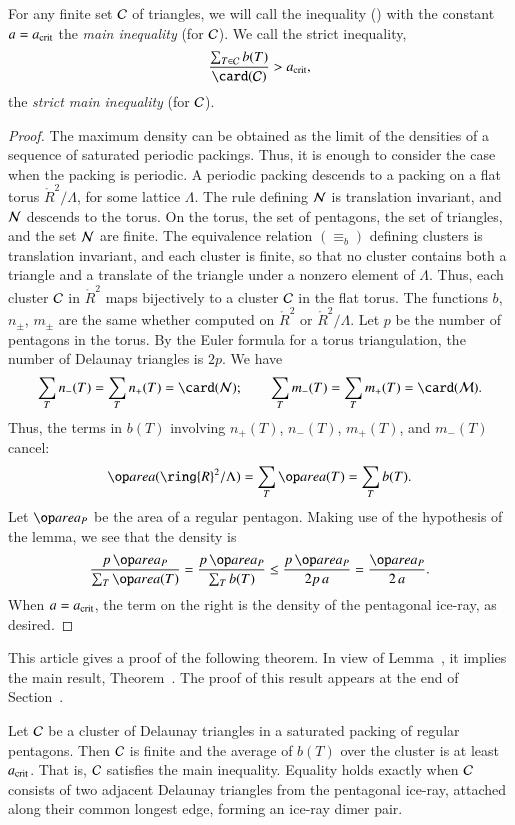 For any finite set $\mathcal C$ of triangles, we will call the inequality
() with the constant $a=a_\text{crit}$ the {\it main inequality}
(for $\mathcal C$).  We call the strict inequality,
\begin{equation}\libel{eqn:strict-main}
\frac{\sum_{T\in \C} b(T)}{\card(\C)} > \acrit,
\end{equation}
the {\it strict main inequality} (for $\mathcal C$).


\begin{proof} The maximum density can be obtained as the limit of the
  densities of a sequence of saturated periodic packings.  Thus, it is
  enough to consider the case when the packing is periodic.  A
  periodic packing descends to a packing on a flat torus
  $\ring{R}^2/\Lambda$, for some lattice $\Lambda$.  The rule defining
  $\mathcal N$ is translation invariant, and $\mathcal N$ descends to the torus.  On
  the torus, the set of pentagons, the set of triangles, and the set
  $\mathcal N$ are finite.  The equivalence relation $(\equiv_b)$ defining
  clusters is translation invariant, and each cluster is finite, so
  that no cluster contains both a triangle and a translate of the
  triangle under a nonzero element of $\Lambda$.  Thus, each cluster
  $\mathcal C$ in $\ring{R}^2$ maps bijectively to a cluster $\mathcal C$ in the flat
  torus.  The functions $b$, $n_\pm$, $m_\pm$ are the same whether
  computed on $\ring{R}^2$ or $\ring{R}^2/\Lambda$.  Let $p$ be the
  number of pentagons in the torus.  By the Euler formula for a torus
  triangulation, the number of Delaunay triangles is $2p$.  We have
\[
\sum_{T} n_-(T) =  \sum_{T} n_+(T) = \card(\N);\qquad
\sum_{T} m_-(T) =  \sum_{T} m_+(T) = \card(\M).
\]
Thus, the terms in $b(T)$ involving $n_+(T)$, $n_-(T)$, $m_+(T)$,
and $m_-(T)$ cancel:
\[
\area(\ring{R}^2/\Lambda) = \sum_T \area(T) = \sum_T b(T).
\]    
Let $\area_P$ be the area of a regular pentagon.  Making use of the
hypothesis of the lemma, we see that the density is
\[
\frac{p\, \area_P}{\sum_T \area(T)} 
=\frac{p\, \area_P}{\sum_T b(T)} \le\frac{p\, \area_P}{2 p\, a} 
= \frac{\area_P}{2\, a}.
\]
When $a=a_\text{crit}$, the term on the right is the density of the
pentagonal ice-ray, as desired.
\end{proof}

This article gives a proof of the following theorem. In view of
Lemma~, it implies the main result,
Theorem~.  The proof of this result appears at the end
of Section~.

\begin{theorem}
  Let $\mathcal C$ be a cluster of Delaunay triangles in a saturated packing
  of regular pentagons.  Then $\mathcal C$ is finite and the average of $b(T)$
  over the cluster is at least $a_\text{crit}$.  That is, $\mathcal C$ satisfies the
  main inequality.  Equality holds exactly when $\mathcal C$ consists of two
  adjacent Delaunay triangles from the pentagonal ice-ray, attached
  along their common longest edge, forming an ice-ray dimer pair.
\end{theorem}

